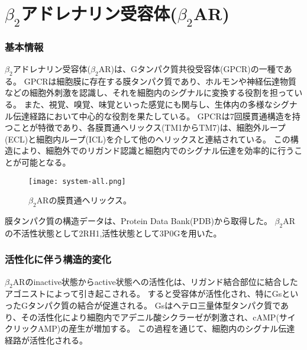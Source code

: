 \section{$\beta_2$アドレナリン受容体($\beta_2$AR)}
\label{sec:b2ar}

\subsubsection{基本情報}
$\beta_2$アドレナリン受容体($\beta_2$AR)は、Gタンパク質共役受容体(GPCR)の一種である。
GPCRは細胞膜に存在する膜タンパク質であり、ホルモンや神経伝達物質などの細胞外刺激を認識し、それを細胞内のシグナルに変換する役割を担っている。
また、視覚、嗅覚、味覚といった感覚にも関与し、生体内の多様なシグナル伝達経路において中心的な役割を果たしている。
GPCRは7回膜貫通構造を持つことが特徴であり、各膜貫通ヘリックス(TM1からTM7)は、細胞外ループ(ECL)と細胞内ループ(ICL)を介して他のヘリックスと連結されている。
この構造により、細胞外でのリガンド認識と細胞内でのシグナル伝達を効率的に行うことが可能となる。

\begin{figure}[htbp]
  \centering
  \texttt{[image: system-all.png]}
  \caption{$\beta_2$ARの膜貫通ヘリックス。}
  \label{fig:all}
\end{figure}

\newpage

膜タンパク質の構造データは、Protein Data Bank(PDB)から取得した。
$\beta_2$ARの不活性状態として2RH1\cite{cherezov2007},活性状態として3P0G\cite{rasmussen2011}を用いた。

\subsubsection{活性化に伴う構造的変化}
$\beta_2$ARのinactive状態からactive状態への活性化は、リガンド結合部位に結合したアゴニストによって引き起こされる。
すると受容体が活性化され、特にGsといったGタンパク質の結合が促進される。
Gsはヘテロ三量体型タンパク質であり、その活性化により細胞内でアデニル酸シクラーゼが刺激され、cAMP(サイクリックAMP)の産生が増加する。
この過程\cite{philip2007}を通じて、細胞内のシグナル伝達経路が活性化される。


